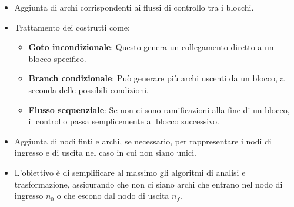 \begin{itemize}
  \item Aggiunta di archi corrispondenti ai flussi di controllo tra i blocchi.
  \item Trattamento dei costrutti come:
  \begin{itemize}
    \item \textbf{Goto incondizionale}: Questo genera un collegamento diretto a
    un blocco specifico.
    \item \textbf{Branch condizionale}: Può generare più archi uscenti da un blocco,
    a seconda delle possibili condizioni.
    \item \textbf{Flusso sequenziale}: Se non ci sono ramificazioni alla fine di un blocco,
    il controllo passa semplicemente al blocco successivo.
  \end{itemize}
  \item Aggiunta di nodi finti e archi, se necessario, per rappresentare i nodi di ingresso
  e di uscita nel caso in cui non siano unici.
  \item L'obiettivo è di semplificare al massimo gli algoritmi di analisi e trasformazione,
  assicurando che non ci siano archi che entrano nel nodo di ingresso $n_0$ o che escono dal
  nodo di uscita $n_f$.
\end{itemize}

